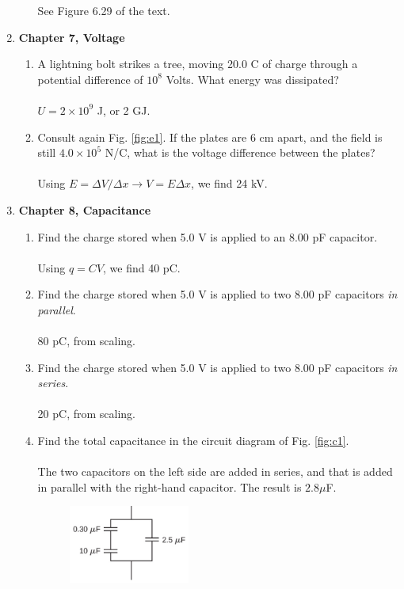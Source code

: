 \documentclass[10pt]{article}
\begin{document}
\begin{enumerate}
\begin{enumerate}
See Figure 6.29 of the text. \\
\end{enumerate}
\item \textbf{Chapter 7, Voltage}
\begin{enumerate}
\item A lightning bolt strikes a tree, moving 20.0 C of charge through a potential difference of $10^8$ Volts. What energy was dissipated? \\ \\
$U = 2 \times 10^{9}$ J, or 2 GJ. \\
\item Consult again Fig. \ref{fig:e1}.  If the plates are 6 cm apart, and the field is still $4.0 \times 10^5$ N/C, what is the voltage difference between the plates? \\ \\
Using $E = \Delta V/\Delta x \rightarrow V = E\Delta x$, we find 24 kV. \\
\end{enumerate}
\item \textbf{Chapter 8, Capacitance}
\begin{enumerate}
\item Find the charge stored when 5.0 V is applied to an 8.00 pF capacitor. \\ \\
Using $q = CV$, we find 40 pC. \\
\item Find the charge stored when 5.0 V is applied to two 8.00 pF capacitors \textit{in parallel}. \\ \\
80 pC, from scaling. \\
\item Find the charge stored when 5.0 V is applied to two 8.00 pF capacitors \textit{in series}. \\ \\
20 pC, from scaling. \\
\item Find the total capacitance in the circuit diagram of Fig. \ref{fig:c1}. \\ \\
The two capacitors on the left side are added in series, and that is added in parallel with the right-hand capacitor.  The result is $2.8 \mu$F. \\
\begin{figure}
\centering
\includegraphics[width=0.4\textwidth]{figures/c1.png}

\end{figure}
\end{enumerate}
\end{enumerate}
\end{document}
